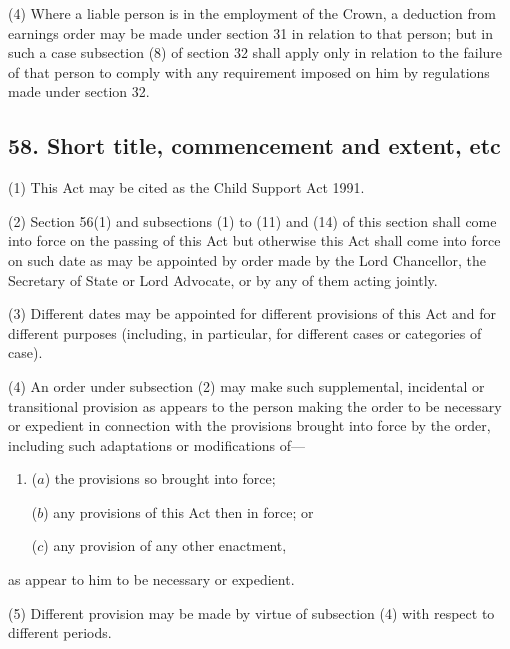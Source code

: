 \documentclass[12pt,a4paper]{article}
\begin{document}
(4) Where a liable person is in the employment of the Crown, a deduction from earnings order may be made under section 31 in relation to that person; but in such a case subsection (8)  of section 32 shall apply only in relation to the failure of that person to comply with any requirement imposed on him by regulations made under section 32.


\subsection{58. Short title, commencement and extent, etc}

(1) This Act may be cited as the Child Support Act 1991.

(2) Section 56(1)  and subsections (1)  to (11)  and (14)  of this section shall come into force on the passing of this Act but otherwise this Act shall come into force on such date as may be appointed by order made by the Lord Chancellor, the Secretary of State or Lord Advocate, or by any of them acting jointly.

(3) Different dates may be appointed for different provisions of this Act and for different purposes (including, in particular, for different cases or categories of case).

(4) An order under subsection (2)  may make such supplemental, incidental or transitional provision as appears to the person making the order to be necessary or expedient in connection with the provisions brought into force by the order, including such adaptations or modifications of—
\begin{enumerate}\item[]
($a$) the provisions so brought into force;

($b$) any provisions of this Act then in force; or

($c$) any provision of any other enactment,
\end{enumerate}
as appear to him to be necessary or expedient.

(5) Different provision may be made by virtue of subsection (4)  with respect to different periods.
\end{document}
